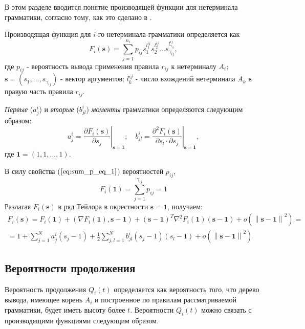 \documentclass[12pt]{article}
\begin{document}
В этом разделе вводится понятие производящей функции для нетерминала грамматики, согласно тому, как это сделано в \cite{lit:sev_vp}.

Производящая функция для $i$-го нетерминала грамматики определяется как
\begin{equation}
	F_i(\mathbf{s}) = \sum_{j=1}^{n_i} p_{ij}s_1^{l^{ij}_1}s_2^{l^{ij}_2} \ldots s_{\gamma_{ij}}^{l^{ij}_{\gamma_{ij}}},
\end{equation}
где $p_{ij}$ - вероятность вывода применения правила $r_{ij}$ к нетерминалу $A_i$; $\mathbf{s} = (s_1,\ldots,s_{\gamma_{ij}})$ - вектор аргументов; $l^{ij}_k$ - число вхождений нетерминала $A_k$  в правую часть правила $r_{ij}$.

\emph{Первые} ($a^i_j$) и \emph{вторые} ($b^i_{jl}$) \emph{моменты} грамматики определяются следующим образом:
\begin{equation}
	a^i_j = \left. \frac{\partial F_i(\mathbf{s})}{\partial s_j} \right|_{\mathbf{s} = \mathbf{1}};\quad
	b^i_{jl} = \left. \frac{\partial^2 F_i(\mathbf{s})}{\partial s_l \cdot \partial s_j} \right|_{\mathbf{s} = \mathbf{1}},
\end{equation}
где $\mathbf{1} = (1,1,\ldots ,1)$.

В силу свойства ($\ref{eq:sum_p_eq_1}$) вероятностей $p_{ij}$,
\begin{equation*}
	F_i(\mathbf{1}) = \sum\limits_{j=1}^{\gamma_{ij}} p_{ij} = 1
\end{equation*}	
Разлагая $F_i(\mathbf{s})$ в ряд Тейлора в окрестности $\mathbf{s} = \mathbf{1}$, получаем:
\begin{multline}
\label{eq:F_i_Taylor}
	F_i(\mathbf{s}) = F_i(\mathbf{1}) + (\nabla F_i(\mathbf{1}),\mathbf{s}-\mathbf{1}) + (\mathbf{s}-\mathbf{1})^T \nabla^2 F_i(\mathbf{1}) (\mathbf{s}-\mathbf{1}) + o(\left\| \mathbf{s}-\mathbf{1} \right\| ^2) = \\
	= 1 + \sum_{j=1}^N a^i_j (s_j - 1) + \frac{1}{2} \sum_{j,l=1}^N b^i_{jl} (s_j-1)(s_l-1) + o(\left\| \mathbf{s} - \mathbf{1} \right\|^2)
\end{multline}

\subsection{Вероятности продолжения}

Вероятность продолжения $Q_i(t)$ определяется как вероятность того, что дерево вывода, имеющее корень $A_i$ и построенное по правилам рассматриваемой грамматики, будет иметь высоту более $t$. Вероятности $Q_i(t)$ можно связать с производящими функциями следующим образом.
\end{document}
